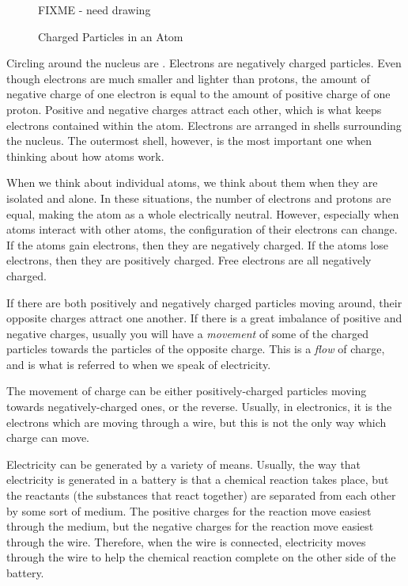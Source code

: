 \begin{figure}
\caption{Charged Particles in an Atom}
\label{figChargedParticles}
FIXME - need drawing
\end{figure}

Circling around the nucleus are .
Electrons are negatively charged particles. 
Even though electrons are much smaller and lighter than protons, the amount of negative charge of one electron is equal to the amount of positive charge of one proton.
Positive and negative charges attract each other, which is what keeps electrons contained within the atom.
Electrons are arranged in shells surrounding the nucleus.
The outermost shell, however, is the most important one when thinking about how atoms work.

When we think about individual atoms, we think about them when they are isolated and alone.
In these situations, the number of electrons and protons are equal, making the atom as a whole electrically neutral.
However, especially when atoms interact with other atoms, the configuration of their electrons can change.
If the atoms gain electrons, then they are negatively charged.
If the atoms lose electrons, then they are positively charged.
Free electrons are all negatively charged.

If there are both positively and negatively charged particles moving around, their opposite charges attract one another.
If there is a great imbalance of positive and negative charges, usually you will have a \emph{movement} of some of the charged particles towards the particles of the opposite charge.
This is a \emph{flow} of charge, and is what is referred to when we speak of electricity.

The movement of charge can be either positively-charged particles moving towards negatively-charged ones, or the reverse.
Usually, in electronics, it is the electrons which are moving through a wire, but this is not the only way which charge can move.

Electricity can be generated by a variety of means.
Usually, the way that electricity is generated in a battery is that a chemical reaction takes place, but the reactants (the substances that react together) are separated from each other by some sort of medium.  
The positive charges for the reaction move easiest through the medium, but the negative charges for the reaction move easiest through the wire.
Therefore, when the wire is connected, electricity moves through the wire to help the chemical reaction complete on the other side of the battery.

